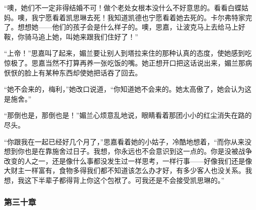 \par “噢，她们不一定非得结婚不可！做个老处女根本没什么不好意思的。看看白蝶姑妈。噢，我宁愿看着凯思琳去死！我知道凯德也宁愿看着她去死的。卡尔弗特家完了。想想她——他们的孩子会是什么样子的。噢，思嘉，让波克马上去给马上好鞍，你骑马追上她，叫她来跟我们住好了！”
\par “上帝！”思嘉叫了起来，媚兰要让别人到塔拉来住的那种认真的态度，使她感到吃惊极了。思嘉当然不打算再养一张吃饭的嘴。她正想开口把这话说出来，媚兰那病恹恹的脸上有某种东西却使她把话吞了回去。
\par “她不会来的，梅利，”她改口说道，“你知道她不会来的。她太高傲了，她会认为这是施舍。”
\par “那倒也是，那倒也是！”媚兰心烦意乱地说，眼睛看着那团小小的红尘消失在路的尽头。
\par “你跟我在一起已经好几个月了，”思嘉看着她的小姑子，冷酷地想着，“而你从来没想到你也是在靠施舍过日子。我想，你永远也不会意识到这一点的。你是没被战争改变的人之一，还是像什么事都没发生过一样思考，一样行事——好像我们还是像大财主一样富有，食物多得我们都不知道该怎么办才好，有多少客人也没关系。我想，我这下半辈子都得背上你这个包袱了。可我还是不会接受凯思琳的。”

\subsubsection{第三十章}

